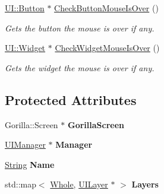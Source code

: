 \begin{DoxyCompactItemize}
\hyperlink{classphys_1_1UI_1_1Button}{UI::Button} $\ast$ \hyperlink{classphys_1_1UIScreen_a7bc1a10b2172ad8885901de1a65a819d}{CheckButtonMouseIsOver} ()
\begin{DoxyCompactList}\small\item\em Gets the button the mouse is over if any. \item\end{DoxyCompactList}\item 
\hyperlink{classphys_1_1UI_1_1Widget}{UI::Widget} $\ast$ \hyperlink{classphys_1_1UIScreen_a00befef8c7bce9e8d149e6ba03419a53}{CheckWidgetMouseIsOver} ()
\begin{DoxyCompactList}\small\item\em Gets the widget the mouse is over if any. \item\end{DoxyCompactList}\end{DoxyCompactItemize}
\subsection*{Protected Attributes}
\begin{DoxyCompactItemize}
\item 
\hypertarget{classphys_1_1UIScreen_a6cc0cb1a19c2b2a8cee20222d1af333c}{
Gorilla::Screen $\ast$ {\bfseries GorillaScreen}}
\label{d9/de8/classphys_1_1UIScreen_a6cc0cb1a19c2b2a8cee20222d1af333c}

\item 
\hypertarget{classphys_1_1UIScreen_a8cb86a27b0ac39426ae23e67e34ebd47}{
\hyperlink{classphys_1_1UIManager}{UIManager} $\ast$ {\bfseries Manager}}
\label{d9/de8/classphys_1_1UIScreen_a8cb86a27b0ac39426ae23e67e34ebd47}

\item 
\hypertarget{classphys_1_1UIScreen_a513aebb318ba6e21fcc95090c4385614}{
\hyperlink{namespacephys_aa03900411993de7fbfec4789bc1d392e}{String} {\bfseries Name}}
\label{d9/de8/classphys_1_1UIScreen_a513aebb318ba6e21fcc95090c4385614}

\item 
\hypertarget{classphys_1_1UIScreen_aab6876d055853ed554e1ab09d0e91ce0}{
std::map$<$ \hyperlink{namespacephys_a460f6bc24c8dd347b05e0366ae34f34a}{Whole}, \hyperlink{classphys_1_1UILayer}{UILayer} $\ast$ $>$ {\bfseries Layers}}
\label{d9/de8/classphys_1_1UIScreen_aab6876d055853ed554e1ab09d0e91ce0}

\end{DoxyCompactItemize}


